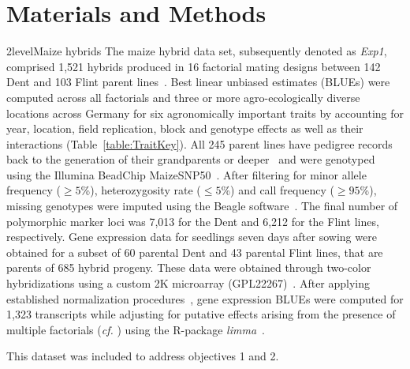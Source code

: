 \documentclass[12pt,titlepage]{article}
\begin{document}
\section{Materials and Methods}
\Genetics2level{Maize hybrids}
The maize hybrid data set, subsequently denoted as \textit{Exp1}, comprised 
1,521 hybrids produced in 16 factorial mating designs between 142 Dent and 103 
Flint parent lines~\cite{Westhues2017}. 
Best linear unbiased estimates (BLUEs) were computed across all factorials and 
three or more agro-ecologically diverse locations across Germany for six 
agronomically important traits by accounting for year, location, field 
replication, block and genotype effects as well as their interactions
(Table~\ref{table:TraitKey}).
All 245 parent lines have pedigree records back to the generation of their 
grandparents or deeper~\cite{Westhues2017} and were genotyped using the Illumina 
BeadChip MaizeSNP50~\cite{Ganal2011}.
After filtering for minor allele frequency ($\geq 5$\%), heterozygosity rate
($\leq 5$\%) and call frequency ($\geq 95$\%), missing genotypes were imputed 
using the Beagle software~\cite{Browning2009}.
The final number of polymorphic marker loci was 7,013 for the Dent and 6,212 for 
the Flint lines, respectively.
Gene expression data for seedlings seven days after sowing were obtained for a 
subset of 60 parental Dent and 43 parental Flint lines, that are parents of 685
hybrid progeny.
These data were obtained through two-color hybridizations using a custom 2K 
microarray (GPL22267)~\cite{Westhues2017}.
After applying established normalization procedures~\cite{Smyth2003,Ritchie2007},
gene expression BLUEs were computed for 1,323 transcripts while adjusting for 
putative effects arising from the presence of multiple factorials (\textit{cf.}
) using the R-package \textit{limma}~\cite{Ritchie2015a}.

This dataset was included to address objectives 1 and 2.
\end{document}
